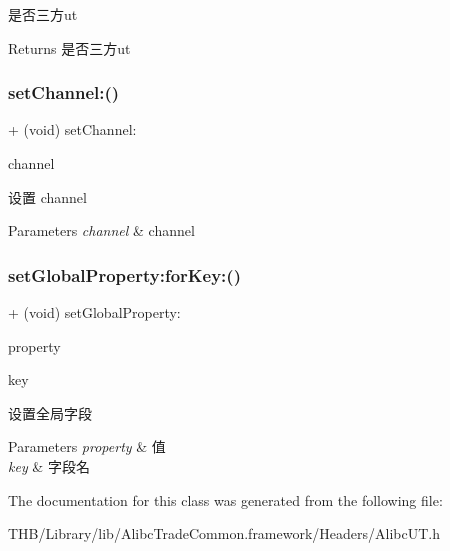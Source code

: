 是否三方ut

\begin{DoxyReturn}{Returns}
是否三方ut 
\end{DoxyReturn}
\mbox{\label{interface_alibc_u_t_ac610e7c624d9770bc4deda8e8fd6a6f6}} 
\subsubsection{\texorpdfstring{set\+Channel\+:()}{setChannel:()}}
{\footnotesize\ttfamily + (void) set\+Channel\+: \begin{DoxyParamCaption}\item[{(N\+S\+String $\ast$)}]{channel }\end{DoxyParamCaption}}

设置 channel


\begin{DoxyParams}{Parameters}
{\em channel} & channel \\
\hline
\end{DoxyParams}
\mbox{\label{interface_alibc_u_t_abadc17969d2a8bc7b9d4f8eeda8fa3ec}} 
\subsubsection{\texorpdfstring{set\+Global\+Property\+:for\+Key\+:()}{setGlobalProperty:forKey:()}}
{\footnotesize\ttfamily + (void) set\+Global\+Property\+: \begin{DoxyParamCaption}\item[{(N\+S\+String $\ast$)}]{property }\item[{forKey:(N\+S\+String $\ast$)}]{key }\end{DoxyParamCaption}}

设置全局字段


\begin{DoxyParams}{Parameters}
{\em property} & 值 \\
\hline
{\em key} & 字段名 \\
\hline
\end{DoxyParams}


The documentation for this class was generated from the following file\+:\begin{DoxyCompactItemize}
\item 
T\+H\+B/\+Library/lib/\+Alibc\+Trade\+Common.\+framework/\+Headers/Alibc\+U\+T.\+h\end{DoxyCompactItemize}
